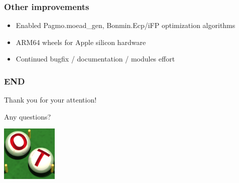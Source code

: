 \documentclass[aspectratio=169]{beamer}
\begin{document}


\begin{frame}
\frametitle{Other improvements}

\begin{itemize}
\item Enabled Pagmo.moead\_gen, Bonmin.Ecp/iFP optimization algorithms
\item ARM64 wheels for Apple silicon hardware
\item Continued bugfix / documentation / modules effort
\end{itemize}

\end{frame}


\begin{frame}
\frametitle{END}

Thank you for your attention!

Any questions?

\begin{center}
\includegraphics[width=0.2\textwidth]{figures/logo-ot-small}
\end{center}

\end{frame}

% 
% 
% 
% 
\end{document}
